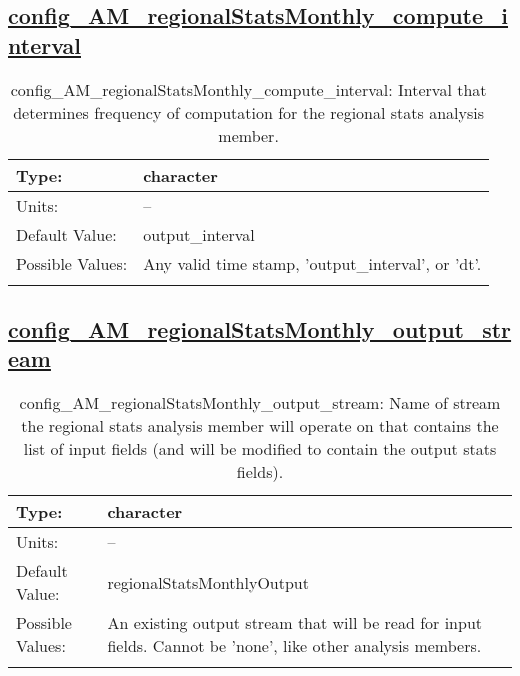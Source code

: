 \subsection[config\_AM\_regionalStatsMonthly\_compute\_interval]{\hyperref[sec:nm_tab_AM_regionalStatsMonthly]{config\_AM\_regionalStatsMonthly\_compute\_interval}}
\label{subsec:nm_sec_config_AM_regionalStatsMonthly_compute_interval}
\begin{center}
\begin{longtable}{| p{2.0in} || p{4.0in} |}
    \hline
    Type: & character \\
    \hline
    Units: & -- \\
    \hline
    Default Value: & output\_interval \\
    \hline
    Possible Values: & Any valid time stamp, 'output\_interval', or 'dt'. \\
    \hline
    \caption{config\_AM\_regionalStatsMonthly\_compute\_interval: Interval that determines frequency of computation for the regional stats analysis member.}
\end{longtable}
\end{center}
\subsection[config\_AM\_regionalStatsMonthly\_output\_stream]{\hyperref[sec:nm_tab_AM_regionalStatsMonthly]{config\_AM\_regionalStatsMonthly\_output\_stream}}
\label{subsec:nm_sec_config_AM_regionalStatsMonthly_output_stream}
\begin{center}
\begin{longtable}{| p{2.0in} || p{4.0in} |}
    \hline
    Type: & character \\
    \hline
    Units: & -- \\
    \hline
    Default Value: & regionalStatsMonthlyOutput \\
    \hline
    Possible Values: & An existing output stream that will be read for input fields. Cannot be 'none', like other analysis members. \\
    \hline
    \caption{config\_AM\_regionalStatsMonthly\_output\_stream: Name of stream the regional stats analysis member will operate on that contains the list of input fields (and will be modified to contain the output stats fields).}
\end{longtable}
\end{center}
